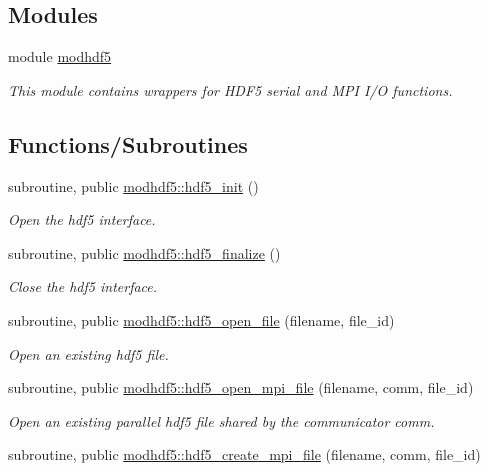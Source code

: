\subsection*{Modules}
\begin{DoxyCompactItemize}
\item 
module \hyperlink{namespacemodhdf5}{modhdf5}
\begin{DoxyCompactList}\small\item\em This module contains wrappers for H\+D\+F5 serial and M\+PI I/O functions. \end{DoxyCompactList}\end{DoxyCompactItemize}
\subsection*{Functions/\+Subroutines}
\begin{DoxyCompactItemize}
\item 
subroutine, public \hyperlink{namespacemodhdf5_a78ec7a0bfdcd60f1ce1ecf0c88bb7cd9}{modhdf5\+::hdf5\+\_\+init} ()
\begin{DoxyCompactList}\small\item\em Open the hdf5 interface. \end{DoxyCompactList}\item 
subroutine, public \hyperlink{namespacemodhdf5_ace643e6a3e592dbe1be4d158888eb477}{modhdf5\+::hdf5\+\_\+finalize} ()
\begin{DoxyCompactList}\small\item\em Close the hdf5 interface. \end{DoxyCompactList}\item 
subroutine, public \hyperlink{namespacemodhdf5_a11539d06d180bff29d3c56ba198451d4}{modhdf5\+::hdf5\+\_\+open\+\_\+file} (filename, file\+\_\+id)
\begin{DoxyCompactList}\small\item\em Open an existing hdf5 file. \end{DoxyCompactList}\item 
subroutine, public \hyperlink{namespacemodhdf5_a9f6976ee158485f6b203635df23156e3}{modhdf5\+::hdf5\+\_\+open\+\_\+mpi\+\_\+file} (filename, comm, file\+\_\+id)
\begin{DoxyCompactList}\small\item\em Open an existing \textquotesingle{}parallel\textquotesingle{} hdf5 file shared by the communicator comm. \end{DoxyCompactList}\item 
subroutine, public \hyperlink{namespacemodhdf5_aba50f37e2c24ac3271cdfc8877ebdcd9}{modhdf5\+::hdf5\+\_\+create\+\_\+mpi\+\_\+file} (filename, comm, file\+\_\+id)

\end{DoxyCompactItemize}
